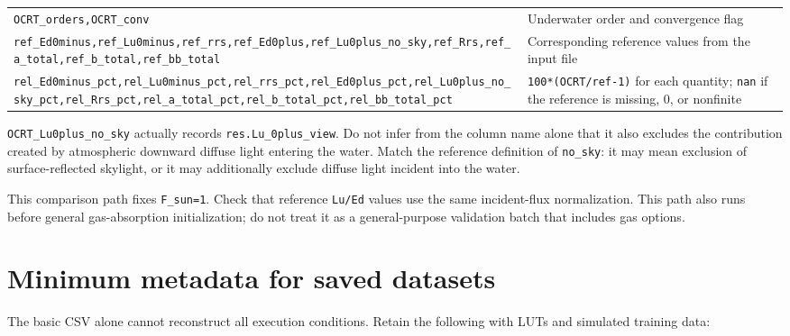 {\begin{longtable}{@{}>{\raggedright\arraybackslash}p{}>{\raggedright\arraybackslash}p{}@{}}
\texttt{OCRT\_\allowbreak{}orders,\allowbreak{}OCRT\_\allowbreak{}conv} & Underwater order and convergence flag \\
\texttt{ref\_\allowbreak{}Ed0minus,\allowbreak{}ref\_\allowbreak{}Lu0minus,\allowbreak{}ref\_\allowbreak{}rrs,\allowbreak{}ref\_\allowbreak{}Ed0plus,\allowbreak{}ref\_\allowbreak{}Lu0plus\_\allowbreak{}no\_\allowbreak{}sky,\allowbreak{}ref\_\allowbreak{}Rrs,\allowbreak{}ref\_\allowbreak{}a\_\allowbreak{}total,\allowbreak{}ref\_\allowbreak{}b\_\allowbreak{}total,\allowbreak{}ref\_\allowbreak{}bb\_\allowbreak{}total} & Corresponding reference values from the input file \\
\texttt{rel\_\allowbreak{}Ed0minus\_\allowbreak{}pct,\allowbreak{}rel\_\allowbreak{}Lu0minus\_\allowbreak{}pct,\allowbreak{}rel\_\allowbreak{}rrs\_\allowbreak{}pct,\allowbreak{}rel\_\allowbreak{}Ed0plus\_\allowbreak{}pct,\allowbreak{}rel\_\allowbreak{}Lu0plus\_\allowbreak{}no\_\allowbreak{}sky\_\allowbreak{}pct,\allowbreak{}rel\_\allowbreak{}Rrs\_\allowbreak{}pct,\allowbreak{}rel\_\allowbreak{}a\_\allowbreak{}total\_\allowbreak{}pct,\allowbreak{}rel\_\allowbreak{}b\_\allowbreak{}total\_\allowbreak{}pct,\allowbreak{}rel\_\allowbreak{}bb\_\allowbreak{}total\_\allowbreak{}pct} & \texttt{100*(OCRT/\allowbreak{}ref-1)} for each quantity; \texttt{nan} if the reference is missing, 0, or nonfinite \\
\end{longtable}
}

\texttt{OCRT\_\allowbreak{}Lu0plus\_\allowbreak{}no\_\allowbreak{}sky} actually records \texttt{res.\allowbreak{}Lu\_\allowbreak{}0plus\_\allowbreak{}view}. Do not infer from the column name alone that it also excludes the contribution created by atmospheric downward diffuse light entering the water. Match the reference definition of \texttt{no\_\allowbreak{}sky}: it may mean exclusion of surface-reflected skylight, or it may additionally exclude diffuse light incident into the water.

This comparison path fixes \texttt{F\_\allowbreak{}sun=\allowbreak{}1}. Check that reference \texttt{Lu/\allowbreak{}Ed} values use the same incident-flux normalization. This path also runs before general gas-absorption initialization; do not treat it as a general-purpose validation batch that includes gas options.

\section{Minimum metadata for saved datasets}
\label{sec:auto:05_output_formats:10}
The basic CSV alone cannot reconstruct all execution conditions. Retain the following with LUTs and simulated training data:

